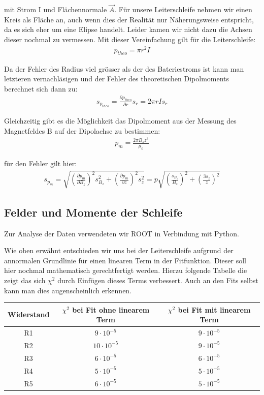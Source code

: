 \documentclass[12pt]{article}
\begin{document}
mit Strom I und Flächennormale $\vec{A}$. Für unsere Leiterschleife nehmen wir einen Kreis als Fläche an, auch wenn dies der Realität nur Näherungsweise entspricht, da es sich eher um eine Elipse handelt. Leider kamen wir nicht dazu die Achsen dieser nochmal zu vermessen. Mit dieser Vereinfachung gilt für die Leiterschleife:
\begin{align}
 p_{theo}=\pi r^2 I
\end{align}

Da der Fehler des Radius viel grösser als der des Bateriestroms ist kann man letzteren vernachläsigen und der Fehler des theoretischen Dipolmoments berechnet sich dann zu:
\begin{align}
 s_{p_{theo}}= \frac{\partial p_{theo}}{\partial r} s_r=2\pi r I s_r
\end{align}

Gleichzeitig gibt es die Möglichkeit das Dipolmoment aus der Messung des Magnetfeldes B auf der Dipolachse zu bestimmen:
\begin{align}
 p_m=\frac{2\pi B_z z^3}{\mu_0}
\end{align}

für den Fehler gilt hier:
\begin{align}
 s_{p_m}=\sqrt{\left( \frac{\partial p_m}{\partial B_z}\right) ^2 s_{B_z}^2+ \left( \frac{\partial p_m}{\partial z}\right) ^2 s_z^2} = p \sqrt{\left( \frac{s_{B_z}}{B_z}\right) ^2 + \left( \frac{3 s_z}{z}\right) ^2}
\end{align}

\subsection{Felder und Momente der Schleife}
Zur Analyse der Daten verwendeten wir ROOT in Verbindung mit Python.

Wie oben erwähnt entschieden wir uns bei der Leiterschleife aufgrund der annormalen Grundlinie für einen linearen Term in der Fitfunktion. Dieser soll hier nochmal mathematisch gerechtfertigt werden. Hierzu folgende Tabelle die zeigt das sich $\chi^2$ durch Einfügen dieses Terms verbessert. Auch an den Fits selbst kann man dies augenscheinlich erkennen.

\begin{center}
\begin{tabular}{|c|cc|}
\hline
Widerstand & $\chi^2$ bei Fit ohne linearem Term & $\chi^2$ bei Fit mit linearem Term \\ 
\hline
R1 & $9 \cdot 10^{-5}$ & $9 \cdot 10^{-5}$ \\ 
R2 & $10 \cdot 10^{-5}$ & $9 \cdot 10^{-5}$ \\ 
R3 & $6 \cdot 10^{-5}$ & $6 \cdot 10^{-5}$ \\ 
R4 & $5 \cdot 10^{-5}$ & $5 \cdot 10^{-5}$ \\ 
R5 & $6 \cdot 10^{-5}$ & $5 \cdot 10^{-5}$ \\
\hline
\end{tabular}
\end{center}
\end{document}
